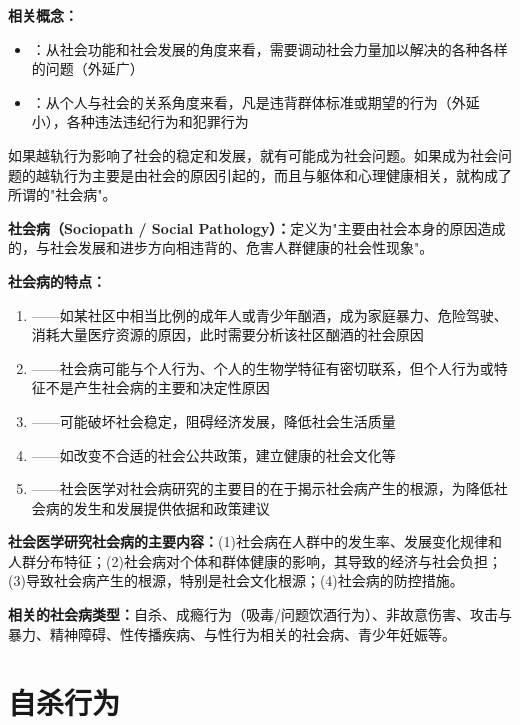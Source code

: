 \begin{keybox}
\textbf{相关概念：}
\begin{itemize}[leftmargin=*]
    \item {}：从社会功能和社会发展的角度来看，需要调动社会力量加以解决的各种各样的问题（外延广）
    \item {}：从个人与社会的关系角度来看，凡是违背群体标准或期望的行为（外延小），各种违法违纪行为和犯罪行为
\end{itemize}

如果越轨行为影响了社会的稳定和发展，就有可能成为社会问题。如果成为社会问题的越轨行为主要是由社会的原因引起的，而且与躯体和心理健康相关，就构成了所谓的"社会病"。

\textbf{社会病（Sociopath / Social Pathology）：}定义为"主要由社会本身的原因造成的，与社会发展和进步方向相违背的、危害人群健康的社会性现象"。

\textbf{社会病的特点：}
\begin{enumerate}[leftmargin=*]
    \item {}——如某社区中相当比例的成年人或青少年酗酒，成为家庭暴力、危险驾驶、消耗大量医疗资源的原因，此时需要分析该社区酗酒的社会原因
    \item {}——社会病可能与个人行为、个人的生物学特征有密切联系，但个人行为或特征不是产生社会病的主要和决定性原因
    \item {}——可能破坏社会稳定，阻碍经济发展，降低社会生活质量
    \item {}——如改变不合适的社会公共政策，建立健康的社会文化等
    \item {}——社会医学对社会病研究的主要目的在于揭示社会病产生的根源，为降低社会病的发生和发展提供依据和政策建议
\end{enumerate}

\textbf{社会医学研究社会病的主要内容：}(1)社会病在人群中的发生率、发展变化规律和人群分布特征；(2)社会病对个体和群体健康的影响，其导致的经济与社会负担；(3)导致社会病产生的根源，特别是社会文化根源；(4)社会病的防控措施。

\textbf{相关的社会病类型：}自杀、成瘾行为（吸毒/问题饮酒行为）、非故意伤害、攻击与暴力、精神障碍、性传播疾病、与性行为相关的社会病、青少年妊娠等。
\end{keybox}

\section{自杀行为}


